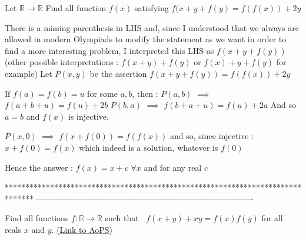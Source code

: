 \begin{solution}
	\begin{tcolorbox}Let $\mathbb{R}\rightarrow \mathbb{R}$
Find all function $f(x)$ satisfying
    $f(x+y+f(y)=f(f(x))+2y$\end{tcolorbox}
There is a missing parenthesis in LHS and, since I understood that we always are allowed in modern Olympiads to modify the statement as we want in order to find a more interesting problem,  I interpreted this LHS as $f(x+y+f(y))$ (other possible interpretations : $f(x+y)+f(y)$ or $f(x)+y+f(y)$ for example)
Let $P(x,y)$ be the assertion $f(x+y+f(y))=f(f(x))+2y$

If $f(a)=f(b)=u$ for some $a,b$, then :
$P(a,b)$ $\implies$ $f(a+b+u)=f(u)+2b$
$P(b,a)$ $\implies$ $f(b+a+u)=f(u)+2a$
And so $a=b$ and $f(x)$ is injective.

$P(x,0)$ $\implies$ $f(x+f(0))=f(f(x))$ and so, since injective : $x+f(0)=f(x)$ which indeed is a solution, whatever is $f(0)$

Hence the answer : $\boxed{f(x)=x+c}$ $\forall x$ and for any real $c$
\end{solution}
*******************************************************************************
-------------------------------------------------------------------------------

\begin{problem}
	Find all functions $ f : \mathbb{R} \rightarrow \mathbb{R}$ such that $~$ $ f(x+y) + xy = f(x)f(y)$ for all reals $x$ and $y$.
	\flushright \href{https://artofproblemsolving.com/community/c6h416198}{(Link to AoPS)}
\end{problem}



